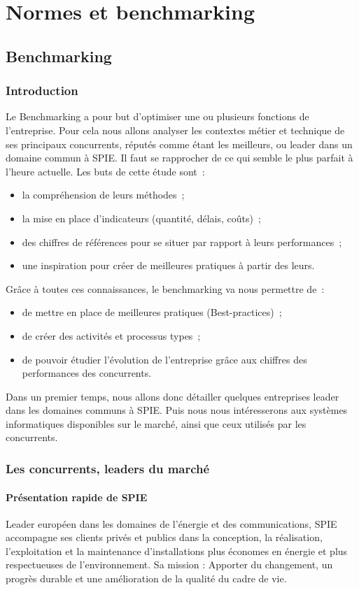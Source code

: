 \chapter{Normes et benchmarking}
\section{Benchmarking}
\subsection{Introduction}
	Le Benchmarking a pour but d'optimiser une ou plusieurs fonctions de l'entreprise. Pour cela nous allons analyser les contextes métier et technique de ses principaux concurrents, réputés comme étant les meilleurs, ou leader dans un domaine commun à SPIE. Il faut se rapprocher de ce qui semble le plus parfait à l'heure actuelle.
	Les buts de cette étude sont~:
\begin{itemize}
	\item la compréhension de leurs méthodes~;
	\item la mise en place d'indicateurs (quantité, délais, coûts)~;
	\item des chiffres de références pour se situer par rapport à leurs performances~;
	\item une inspiration pour créer de meilleures pratiques à partir des leurs.
\end{itemize}
	Grâce à toutes ces connaissances, le benchmarking va nous permettre de~:
\begin{itemize}
	\item de mettre en place de meilleures pratiques (Best-practices)~;
	\item de créer des activités et processus types~;
	\item de pouvoir étudier l'évolution de l'entreprise grâce aux chiffres des performances des concurrents.
\end{itemize}

	Dans un premier temps, nous allons donc détailler quelques entreprises leader dans les domaines communs à SPIE. Puis nous nous intéresserons aux systèmes informatiques disponibles sur le marché, ainsi que ceux utilisés par les concurrents.

\subsection{Les concurrents, leaders du marché}
\subsubsection{Présentation rapide de SPIE}
	Leader européen dans les domaines de l'énergie et des communications, SPIE accompagne ses clients privés et publics dans la conception, la réalisation, l'exploitation et la maintenance d'installations plus économes en énergie et plus respectueuses de l'environnement.
	Sa mission : Apporter du changement, un progrès durable et une amélioration de la qualité du cadre de vie.

